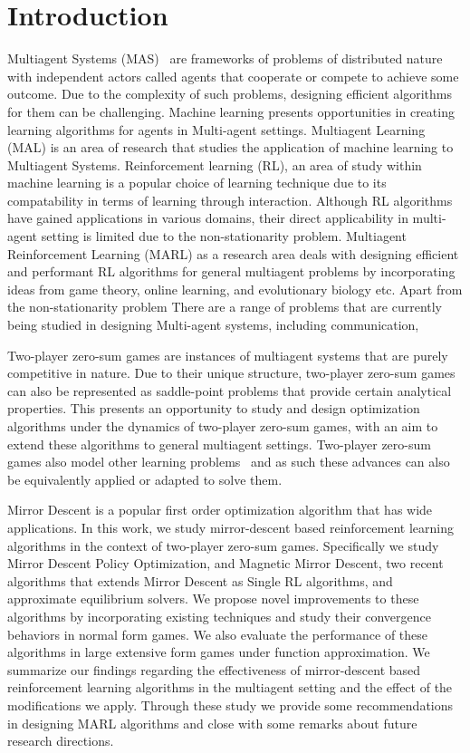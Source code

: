 \chapter{Introduction}

Multiagent Systems (MAS)~\cite{tuylsMultiagent2012} are frameworks of problems of distributed nature with independent actors called agents 
that cooperate or compete to achieve some outcome.
Due to the complexity of such problems, designing efficient algorithms for them can be challenging.
Machine learning presents opportunities in creating learning algorithms for agents in Multi-agent settings.
Multiagent Learning (MAL) is an area of research that studies the application of machine learning to 
Multiagent Systems.
Reinforcement learning (RL), an area of study within machine learning is a popular choice of learning technique 
due to its compatability in terms of learning through interaction.
Although RL algorithms have gained applications in various domains, their direct
applicability in multi-agent setting is limited due to the non-stationarity problem.
Multiagent Reinforcement Learning (MARL) as a research area deals with designing efficient and 
performant RL algorithms for general multiagent problems by incorporating ideas from game theory, online learning, and evolutionary
biology etc.
Apart from the non-stationarity problem 
There are a range of problems that are currently being studied in designing Multi-agent systems, including 
communication, 

Two-player zero-sum games are instances of multiagent systems that are purely competitive in nature.
Due to their unique structure, two-player zero-sum games can also be represented as saddle-point 
problems that provide certain analytical properties.
This presents an opportunity to study and design optimization algorithms under the dynamics of two-player 
zero-sum games, with an aim to extend these algorithms to general multiagent settings.
Two-player zero-sum games also model other learning problems~\cite{goodfellowGenerative2014} and as such these advances can also be equivalently 
applied or adapted to solve them. 

Mirror Descent is a popular first order optimization algorithm that has wide applications.
In this work, we study mirror-descent based reinforcement learning algorithms in the context of
two-player zero-sum games.
Specifically we study Mirror Descent Policy Optimization, and Magnetic Mirror Descent, two recent
algorithms that extends Mirror Descent as Single RL algorithms, and approximate equilibrium solvers.
We propose novel improvements to these algorithms by incorporating existing techniques and study their convergence 
behaviors in normal form games.
We also evaluate the performance of these algorithms in large extensive form
games under function approximation.
We summarize our findings regarding the effectiveness of mirror-descent based reinforcement
learning algorithms in the multiagent setting and the effect of the modifications we apply.
Through these study we provide some recommendations in designing MARL algorithms and  
close with some remarks about future research directions.

